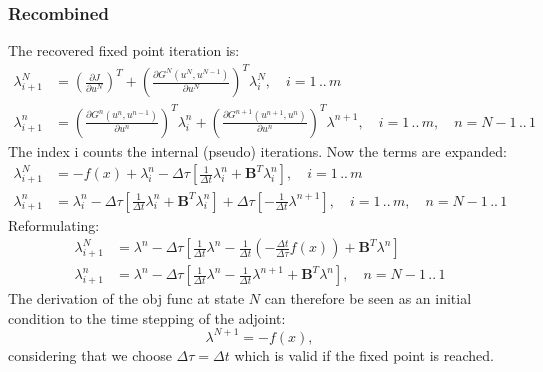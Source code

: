\subsubsection*{Recombined}
The recovered fixed point iteration is:
\begin{align}
\lambda^{N}_{i+1} &= \left( \frac{\partial J}{\partial u^N} \right)^T + \left( \frac{\partial G^N\left( u^N,u^{N-1} \right)}{\partial u^N}  \right)^T \lambda^N_i ,\quad i = 1\,..\,m \\
\lambda^{n}_{i+1} &=  \left( \frac{\partial G^n\left( u^n,u^{n-1} \right)}{\partial u^n}  \right)^T \lambda^n_i  +\left( \frac{\partial G^{n+1}\left( u^{n+1},u^{n} \right)}{\partial u^n}  \right)^T \lambda^{n+1} ,\quad i = 1\,..\,m,\quad n = N-1\,..\, 1
\end{align}
The index i counts the internal (pseudo) iterations. Now the terms are expanded:
\begin{align}
\lambda^{N}_{i+1} &= -f(x) + \lambda^n_i - \Delta\tau\left[ \frac{1}{\Delta t} \lambda^n_i + \mathbf{B}^T \lambda^n_i \right] ,\quad i = 1\,..\,m \\
\lambda^{n}_{i+1} &= \lambda^n_i - \Delta\tau\left[ \frac{1}{\Delta t} \lambda^n_i + \mathbf{B}^T \lambda^n_i \right] + \Delta\tau\left[ -\frac{1}{\Delta t} \lambda^{n+1} \right]  ,\quad i = 1\,..\,m ,\quad n = N-1\,..\, 1
\end{align}
Reformulating:
\begin{align}
\lambda^{N}_{i+1} &= \lambda^n - \Delta\tau\left[ \frac{1}{\Delta t} \lambda^n - \frac{1}{\Delta t} \left( - \frac{\Delta t}{\Delta\tau} f(x) \right) + \mathbf{B}^T \lambda^n \right]  \\
\lambda^{n}_{i+1} &= \lambda^n - \Delta\tau\left[ \frac{1}{\Delta t} \lambda^n - \frac{1}{\Delta t} \lambda^{n+1} + \mathbf{B}^T \lambda^n \right]  ,\quad n = N-1\,..\, 1
\end{align}
The derivation of the obj func at state $N$ can therefore be seen as an initial condition to the time stepping of the adjoint:
\begin{equation}
\lambda^{N+1} = -f(x),
\end{equation}
considering that we choose $\Delta\tau=\Delta t$ which is valid if the fixed point is reached.
